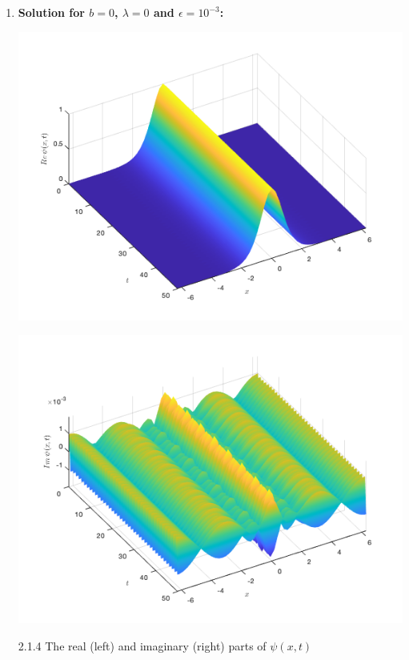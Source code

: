 \documentclass[12pt, letterpaper, twoside]{article}
\begin{document}
\begin{enumerate}[label=(\roman*)]
\item \textbf{Solution for $b = 0$, $\lambda=0$ and $\epsilon = 10^{-3}$:}
\begin{multicols}{2}
\begin{center}
    \includegraphics[scale=0.35]{Figures/(b0real).png}
\end{center}
\begin{center}
    \includegraphics[scale=0.35]{Figures/(b0imag).png}
\end{center}
\end{multicols}
\figurename{ 2.1.4 The real (left) and imaginary (right) parts of $\psi(x, t)$}


\end{enumerate}
\end{document}
